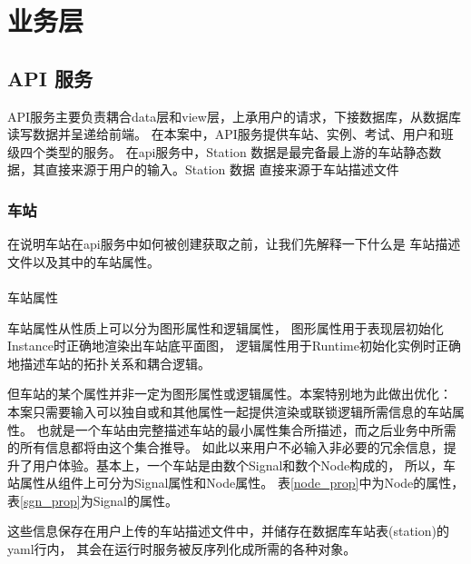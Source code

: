 \section{业务层}

\subsection{API 服务}
API服务主要负责耦合data层和view层，上承用户的请求，下接数据库，从数据库读写数据并呈递给前端。
在本案中，API服务提供车站、实例、考试、用户和班级四个类型的服务。
在api服务中，Station 数据是最完备最上游的车站静态数据，其直接来源于用户的输入。Station 数据
直接来源于车站描述文件

\subsubsection{车站}

在说明车站在api服务中如何被创建获取之前，让我们先解释一下什么是
车站描述文件以及其中的车站属性。

\paragraph{}车站属性

车站属性从性质上可以分为图形属性和逻辑属性，
图形属性用于表现层初始化Instance时正确地渲染出车站底平面图，
逻辑属性用于Runtime初始化实例时正确地描述车站的拓扑关系和耦合逻辑。

但车站的某个属性并非一定为图形属性或逻辑属性。本案特别地为此做出优化：
本案只需要输入可以独自或和其他属性一起提供渲染或联锁逻辑所需信息的车站属性。
也就是一个车站由完整描述车站的最小属性集合所描述，而之后业务中所需的所有信息都将由这个集合推导。
如此以来用户不必输入非必要的冗余信息，提升了用户体验。基本上，一个车站是由数个Signal和数个Node构成的，
所以，车站属性从组件上可分为Signal属性和Node属性。
表\ref{node_prop}中为Node的属性，
表\ref{sgn_prop}为Signal的属性。

这些信息保存在用户上传的车站描述文件中，并储存在数据库车站表(station)的yaml行内，
其会在运行时服务被反序列化成所需的各种对象。


